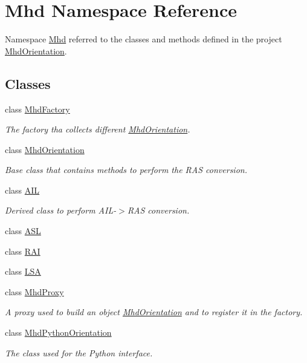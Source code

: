 \hypertarget{namespaceMhd}{\section{\-Mhd \-Namespace \-Reference}
\label{namespaceMhd}
}


\-Namespace \hyperlink{namespaceMhd}{\-Mhd} referred to the classes and methods defined in the project \hyperlink{classMhd_1_1MhdOrientation}{\-Mhd\-Orientation}.  


\subsection*{\-Classes}
\begin{DoxyCompactItemize}
\item 
class \hyperlink{classMhd_1_1MhdFactory}{\-Mhd\-Factory}
\begin{DoxyCompactList}\small\item\em \-The factory tha collects different \hyperlink{classMhd_1_1MhdOrientation}{\-Mhd\-Orientation}. \end{DoxyCompactList}\item 
class \hyperlink{classMhd_1_1MhdOrientation}{\-Mhd\-Orientation}
\begin{DoxyCompactList}\small\item\em \-Base class that contains methods to perform the \-R\-A\-S conversion. \end{DoxyCompactList}\item 
class \hyperlink{classMhd_1_1AIL}{\-A\-I\-L}
\begin{DoxyCompactList}\small\item\em \-Derived class to perform \-A\-I\-L-\/$>$\-R\-A\-S conversion. \end{DoxyCompactList}\item 
class \hyperlink{classMhd_1_1ASL}{\-A\-S\-L}
\item 
class \hyperlink{classMhd_1_1RAI}{\-R\-A\-I}
\item 
class \hyperlink{classMhd_1_1LSA}{\-L\-S\-A}
\item 
class \hyperlink{classMhd_1_1MhdProxy}{\-Mhd\-Proxy}
\begin{DoxyCompactList}\small\item\em \-A proxy used to build an object \hyperlink{classMhd_1_1MhdOrientation}{\-Mhd\-Orientation} and to register it in the factory. \end{DoxyCompactList}\item 
class \hyperlink{classMhd_1_1MhdPythonOrientation}{\-Mhd\-Python\-Orientation}
\begin{DoxyCompactList}\small\item\em \-The class used for the \-Python interface. \end{DoxyCompactList}\end{DoxyCompactItemize}
